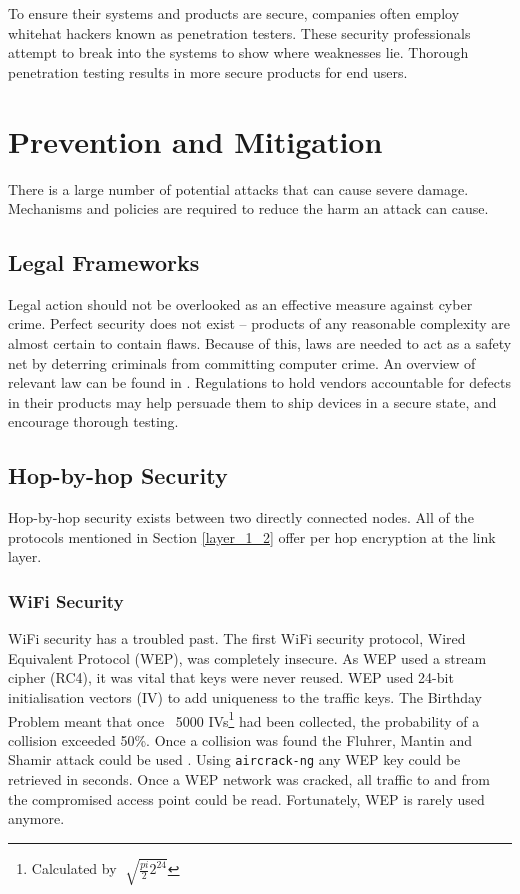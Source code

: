 \documentclass[10pt,journal,compsoc]{IEEEtran}
\begin{document}
To ensure their systems and products are secure, companies often employ
whitehat hackers known as penetration testers. These security professionals
attempt to break into the systems to show where weaknesses lie. Thorough
penetration testing results in more secure products for end users.

\section{Prevention and Mitigation} 
There is a large number of potential attacks that can cause severe damage.
Mechanisms and policies are required to reduce the harm an attack can cause. 

\subsection{Legal Frameworks}
Legal action should not be overlooked as an effective measure against cyber
crime. Perfect security does not exist \cite{ThereMustBeA} -- products of any
reasonable complexity are almost certain to contain flaws. Because of this,
laws are needed to act as a safety net by deterring criminals from committing
computer crime. An overview of relevant law can be found in \cite{Weber2010}.
Regulations to hold vendors accountable for defects in their products may help
persuade them to ship devices in a secure state, and encourage thorough
testing. 

\subsection{Hop-by-hop Security}
Hop-by-hop security exists between two directly connected nodes. All of the
protocols mentioned in Section \ref{layer_1_2} offer per hop encryption at the
link layer. 

\subsubsection{WiFi Security}
WiFi security has a troubled past. The first WiFi security protocol, Wired
Equivalent Protocol (WEP), was completely insecure. As WEP used a stream cipher
(RC4), it was vital that keys were never reused. WEP used 24-bit initialisation
vectors (IV) to add uniqueness to the traffic keys. The Birthday Problem meant
that once ~5000 IVs\footnote{Calculated by $\sqrt[]{\frac{pi}{2} 2^{24}} $}
had been collected, the probability of a collision exceeded 50\%. Once a
collision was found the Fluhrer, Mantin and Shamir attack could be used
\cite{Fluhrer2001}. Using {\tt aircrack-ng} any WEP key could be retrieved in
seconds. Once a WEP network was cracked, all traffic to and from the
compromised access point could be read. Fortunately, WEP is rarely used
anymore.
\end{document}
